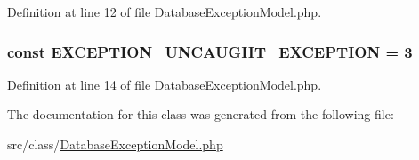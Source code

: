 Definition at line 12 of file Database\+Exception\+Model.\+php.

\hypertarget{class_database_exception_model_aa329d5b77c2ad7a40e283926c6c6dc2e}{}
\subsubsection[{E\+X\+C\+E\+P\+T\+I\+O\+N\+\_\+\+U\+N\+C\+A\+U\+G\+H\+T\+\_\+\+E\+X\+C\+E\+P\+T\+I\+O\+N}]{\setlength{\rightskip}{0pt plus 5cm}const E\+X\+C\+E\+P\+T\+I\+O\+N\+\_\+\+U\+N\+C\+A\+U\+G\+H\+T\+\_\+\+E\+X\+C\+E\+P\+T\+I\+O\+N = 3}\label{class_database_exception_model_aa329d5b77c2ad7a40e283926c6c6dc2e}


Definition at line 14 of file Database\+Exception\+Model.\+php.



The documentation for this class was generated from the following file\+:\begin{DoxyCompactItemize}
\item 
src/class/\hyperlink{_database_exception_model_8php}{Database\+Exception\+Model.\+php}\end{DoxyCompactItemize}
